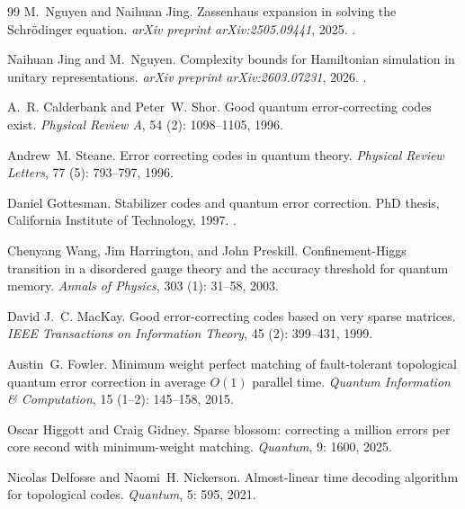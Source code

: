 \documentclass[reprint,aps,prxquantum,amsmath,amssymb,floatfix,nofootinbib,longbibliography]{revtex4-2}
\theoremstyle{definition}
\theoremstyle{remark}
\theoremstyle{plain}
\begin{document}
\begin{thebibliography}{99}
M.~Nguyen and Naihuan Jing.
\newblock Zassenhaus expansion in solving the {Schr\"odinger} equation.
\newblock \emph{arXiv preprint arXiv:2505.09441}, 2025.
\newblock {}.

Naihuan Jing and M.~Nguyen.
\newblock Complexity bounds for {Hamiltonian} simulation in unitary
  representations.
\newblock \emph{arXiv preprint arXiv:2603.07231}, 2026.
\newblock {}.

A.~R. Calderbank and Peter~W. Shor.
\newblock Good quantum error-correcting codes exist.
\newblock \emph{Physical Review A}, 54 (2): 1098--1105, 1996.

Andrew~M. Steane.
\newblock Error correcting codes in quantum theory.
\newblock \emph{Physical Review Letters}, 77 (5): 793--797,
  1996.

Daniel Gottesman.
\newblock Stabilizer codes and quantum error correction.
\newblock PhD thesis, California Institute of Technology, 1997.
\newblock {}.

Chenyang Wang, Jim Harrington, and John Preskill.
\newblock Confinement-{Higgs} transition in a disordered gauge theory and the
  accuracy threshold for quantum memory.
\newblock \emph{Annals of Physics}, 303 (1): 31--58, 2003.

David J.~C. MacKay.
\newblock Good error-correcting codes based on very sparse matrices.
\newblock \emph{IEEE Transactions on Information Theory}, 45
  (2): 399--431, 1999.

Austin~G. Fowler.
\newblock Minimum weight perfect matching of fault-tolerant topological quantum
  error correction in average {$O(1)$} parallel time.
\newblock \emph{Quantum Information \& Computation}, 15 (1--2):
  145--158, 2015.

Oscar Higgott and Craig Gidney.
\newblock Sparse blossom: correcting a million errors per core second with
  minimum-weight matching.
\newblock \emph{Quantum}, 9: 1600, 2025.

Nicolas Delfosse and Naomi~H. Nickerson.
\newblock Almost-linear time decoding algorithm for topological codes.
\newblock \emph{Quantum}, 5: 595, 2021.


\end{thebibliography}
\end{document}
